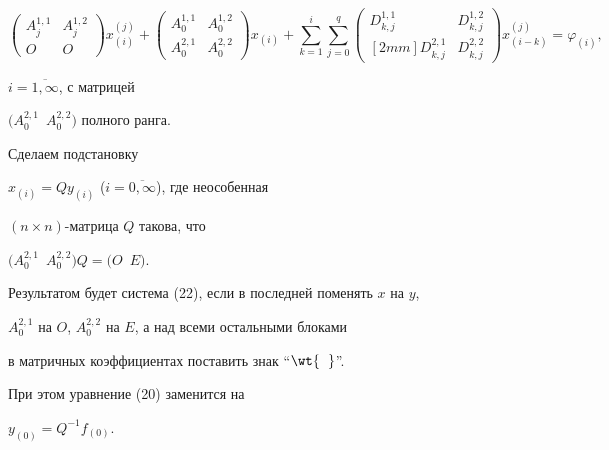 \begin{pf}
\begin{equation}
{{\begin{pmatrix}


 A_j^{1,1} & A_j^{1,2} \\


 O & O 


\end{pmatrix}}


x_{(i)}^{(j)}}+


{\begin{pmatrix}


 A_0^{1,1} & A_0^{1,2}\\


 A_0^{2,1} & A_0^{2,2}


\end{pmatrix}}


x_{(i)}+


\sum_{k=1}^{i}{


\sum_{j=0}^{q}{ 


\begin{pmatrix}


 D_{k,j}^{1,1} & D_{k,j}^{1,2} \\ [2mm]


 D_{k,j}^{2,1} & D_{k,j}^{2,2} 


\end{pmatrix}


x_{(i-k)}^{(j)}}}=\varphi_{(i)}, 


\end{equation}


$i=\overline{1,\infty }$, с матрицей


$\big( A_{0}^{2,1} \ \; A_{0}^{2,2}\big)$ полного ранга.





Сделаем подстановку


$ x_{(i)}=Q y_{(i)}$ ($i=\overline{0, \infty}$), где неособенная 


$(n\times n)$-матрица $Q$ такова, что


$\big( A_{0}^{2,1} \ \; A_{0}^{2,2}\big)Q=\big(O \ \; E\big)$. 


Результатом будет система (22), если в последней поменять $x$ на $y$,


$A_{0}^{2,1}$ на $O$, $A_{0}^{2,2}$ на $E$, а над всеми остальными блоками 


в матричных коэффициентах поставить знак ``$\wt{\phantom{n}}$''.


При этом уравнение (20) заменится на


$y_{(0)}=Q^{-1}f_{(0)}$.



\end{pf}
